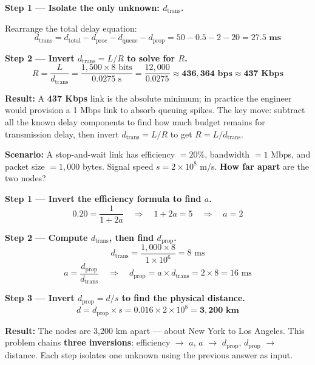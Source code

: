\documentclass[11pt, letterpaper]{article}
\begin{document}
\textbf{Step 1 --- Isolate the only unknown: $d_{\text{trans}}$.}

Rearrange the total delay equation:
\[d_{\text{trans}} = d_{\text{total}} - d_{\text{proc}} - d_{\text{queue}} - d_{\text{prop}}
   = 50 - 0.5 - 2 - 20 = \mathbf{27.5\text{ ms}}\]

\textbf{Step 2 --- Invert $d_{\text{trans}} = L/R$ to solve for $R$.}
\[R = \frac{L}{d_{\text{trans}}} = \frac{1{,}500 \times 8 \text{ bits}}{0.0275 \text{ s}}
   = \frac{12{,}000}{0.0275} \approx \mathbf{436{,}364 \text{ bps} \approx 437 \text{ Kbps}}\]

\begin{tcolorbox}[colback=part4bg, colframe=sectionorange, arc=3pt, boxrule=1pt]
\textbf{Result:} A \textbf{437 Kbps} link is the absolute minimum; in practice the engineer
would provision a 1 Mbps link to absorb queuing spikes. The key move: subtract all the
known delay components to find how much budget remains for transmission delay, then
invert $d_{\text{trans}} = L/R$ to get $R = L/d_{\text{trans}}$.
\end{tcolorbox}

\vspace{8pt}

\begin{tcolorbox}[colback=part4bg, colframe=sectionorange,
  title={\bfseries Problem A2 --- Solve for Distance from Efficiency}, arc=3pt, boxrule=1pt]
\textbf{Scenario:} A stop-and-wait link has efficiency $= 20\%$, bandwidth $= 1$ Mbps,
and packet size $= 1{,}000$ bytes. Signal speed $s = 2 \times 10^8$ m/s.
\textbf{How far apart} are the two nodes?
\end{tcolorbox}

\textbf{Step 1 --- Invert the efficiency formula to find $a$.}
\[0.20 = \frac{1}{1+2a} \quad\Longrightarrow\quad 1+2a = 5 \quad\Longrightarrow\quad a = 2\]

\textbf{Step 2 --- Compute $d_{\text{trans}}$, then find $d_{\text{prop}}$.}
\[d_{\text{trans}} = \frac{1{,}000 \times 8}{1 \times 10^6} = 8 \text{ ms}\]
\[a = \frac{d_{\text{prop}}}{d_{\text{trans}}} \quad\Longrightarrow\quad
   d_{\text{prop}} = a \times d_{\text{trans}} = 2 \times 8 = 16 \text{ ms}\]

\textbf{Step 3 --- Invert $d_{\text{prop}} = d/s$ to find the physical distance.}
\[d = d_{\text{prop}} \times s = 0.016 \times 2\times10^8 = \mathbf{3{,}200 \text{ km}}\]

\begin{tcolorbox}[colback=part4bg, colframe=sectionorange, arc=3pt, boxrule=1pt]
\textbf{Result:} The nodes are 3{,}200 km apart --- about New York to Los Angeles.
This problem chains \textbf{three inversions}: efficiency $\to$ $a$, $a$ $\to$
$d_{\text{prop}}$, $d_{\text{prop}}$ $\to$ distance. Each step isolates one unknown
using the previous answer as input.
\end{tcolorbox}
\end{document}
